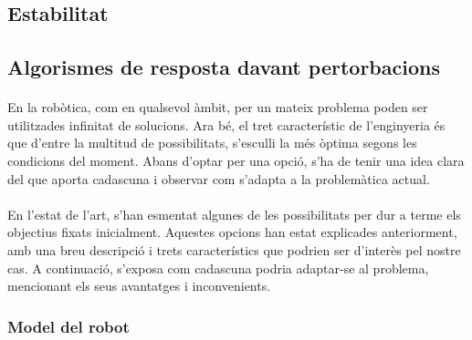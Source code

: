 \documentclass[12pt,a4paper,final,twoside]{article}
\begin{document}
\label{Estabilitat}
\subsection{Estabilitat}

\subsection{Algorismes de resposta davant pertorbacions}
\label{Algorismes}
\paragraph{}En la robòtica, com en qualsevol àmbit, per un mateix problema poden ser utilitzades infinitat de solucions. Ara bé, el tret característic de l'enginyeria és que d'entre la multitud de possibilitats, s'esculli la més òptima segons les condicions del moment. Abans d'optar per una opció, s'ha de tenir una idea clara del que aporta cadascuna i observar com s'adapta a la problemàtica actual.

\paragraph{}En l'estat de l'art, s'han esmentat algunes de les possibilitats per dur a terme els objectius fixats inicialment. Aquestes opcions han estat explicades anteriorment, amb una breu descripció i trets característics que podrien ser d'interès pel nostre cas. A continuació, s'exposa com cadascuna podria adaptar-se al problema, mencionant els seus avantatges i inconvenients.

\subsubsection{Model del robot}

\end{document}
